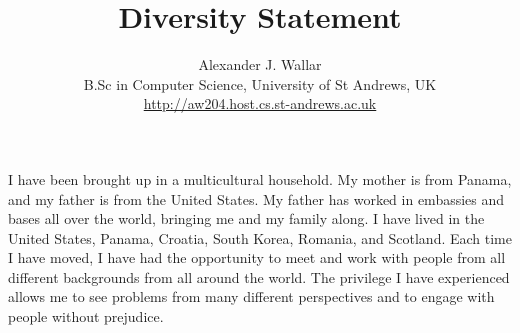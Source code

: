\documentclass{article}
\begin{document}
\setlength{\parskip}{4pt} %

\title{Diversity Statement}

\author{Alexander J. Wallar \\ B.Sc in Computer Science, University of St Andrews, UK
\\ \url{http://aw204.host.cs.st-andrews.ac.uk}}

\maketitle

I have been brought up in a multicultural household. My mother is from Panama,
and my father is from the United States. My father has worked in embassies and
bases all over the world, bringing me and my family along. I have lived in the
United States, Panama, Croatia, South Korea, Romania, and Scotland. Each time I
have moved, I have had the opportunity to meet and work with people from all
different backgrounds from all around the world. The privilege I have
experienced allows me to see problems from many different perspectives and to
engage with people without prejudice.

 
\end{document}
